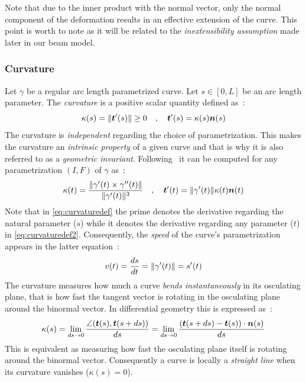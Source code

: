 Note that due to the inner product with the normal vector, only the normal component of the deformation results in an effective extension of the curve. This point is worth to note as it will be related to the \emph{inextensibility assumption} made later in our beam model.

\subsubsection{Curvature}
Let $\gamma$ be a regular arc length parametrized curve. Let $s \in [0,L]$ be an arc length parameter. The \emph{curvature} is a positive scalar quantity defined as~:
\begin{equation}
	\kappa(s) = \lVert\boldsymbol{t}'(s)\rVert \ge 0 
	\quad,\quad
	\boldsymbol{t}'(s) = \kappa(s) \boldsymbol{n}(s)
\label{eq:curvaturedef}
\end{equation}
The curvature is \emph{independent} regarding the choice of parametrization. This makes the curvature an \emph{intrinsic property} of a given curve and that is why it is also referred to as a \emph{geometric invariant}. Following~\cite[pp.203-204]{Gray2006} it can be computed for any parametrization $(I,F)$ of $\gamma$ as~:
\begin{equation}
	\kappa(t) = \frac{\lVert\gamma'(t) \times \gamma''(t)\rVert}{\lVert\gamma'(t)\rVert^3}
	\quad,\quad
	\boldsymbol{t}'(t) = \lVert\gamma'(t)\rVert \kappa(t) \boldsymbol{n}(t)
\label{eq:curvaturedef2}
\end{equation}
Note that in \cref{eq:curvaturedef} the prime denotes the derivative regarding the natural parameter ($s$) while it denotes the derivative regarding any parameter ($t$) in \cref{eq:curvaturedef2}. Consequently, the \emph{speed} of the curve's parametrization appears in the latter equation~:
\begin{equation}
	v(t) = \frac{ds}{dt} = \lVert\gamma'(t)\rVert = s'(t)
\end{equation}
The curvature measures how much a curve \emph{bends instantaneously} in its osculating plane, that is how fast the tangent vector is rotating in the osculating plane around the binormal vector. In differential geometry this is expressed as~:
\begin{equation}
	\kappa(s)
	= \lim_{ds \to 0}\frac{\angle(\boldsymbol{t}(s),\boldsymbol{t}(s+ds))}{ds}
	= \lim_{ds \to 0}\frac{(\boldsymbol{t}(s+ds) - \boldsymbol{t}(s)) \cdot \boldsymbol{n}(s)}{ds}
\end{equation}
This is equivalent as measuring how fast the osculating plane itself is rotating around the binormal vector. Consequently a curve is locally a \emph{straight line} when its curvature vanishes ($\kappa(s)= 0$).

